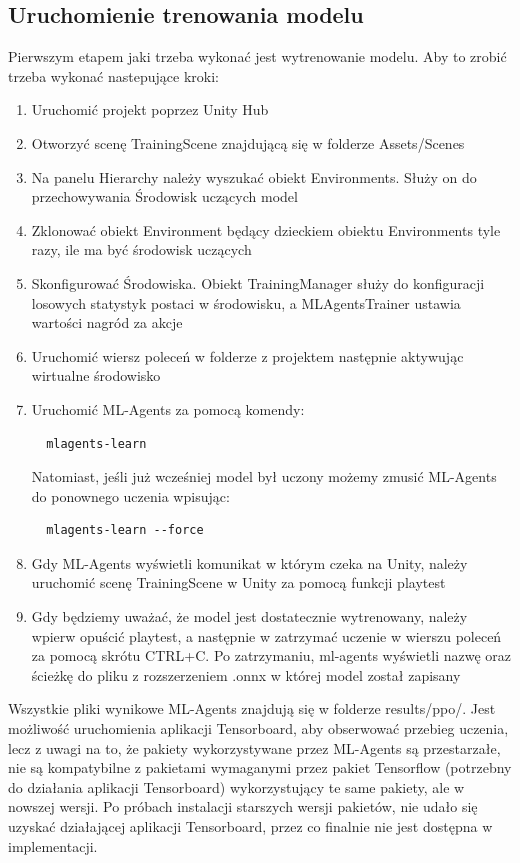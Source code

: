 \documentclass{SGGW-thesis}
\begin{document}
\subsection{Uruchomienie trenowania modelu}
Pierwszym etapem jaki trzeba wykonać jest wytrenowanie modelu. Aby to zrobić trzeba wykonać nastepujące kroki:
\begin{enumerate}
  \item{Uruchomić projekt poprzez Unity Hub}
  \item{Otworzyć scenę TrainingScene znajdującą się w folderze Assets/Scenes}
  \item{Na panelu Hierarchy należy wyszukać obiekt Environments. Służy on do przechowywania Środowisk uczących model}
  \item{Zklonować obiekt Environment będący dzieckiem obiektu Environments tyle razy, ile ma być środowisk uczących}
  \item{Skonfigurować Środowiska. Obiekt TrainingManager służy do konfiguracji losowych statystyk postaci w środowisku, a MLAgentsTrainer ustawia wartości nagród za akcje}
  \item{Uruchomić wiersz poleceń w folderze z projektem następnie aktywując wirtualne środowisko}
  \item{Uruchomić ML-Agents za pomocą komendy:
  \begin{lstlisting}
  mlagents-learn
  \end{lstlisting}
  Natomiast, jeśli już wcześniej model był uczony możemy zmusić ML-Agents do ponownego uczenia wpisując:
  \begin{lstlisting}
  mlagents-learn --force
  \end{lstlisting}}
  \item{Gdy ML-Agents wyświetli komunikat w którym czeka na Unity, należy uruchomić scenę TrainingScene w Unity za pomocą funkcji playtest}
  \item{Gdy będziemy uważać, że model jest dostatecznie wytrenowany, należy wpierw opuścić playtest, a następnie w zatrzymać uczenie w wierszu poleceń za pomocą skrótu CTRL+C.
  Po zatrzymaniu, ml-agents wyświetli nazwę oraz ścieżkę do pliku z rozszerzeniem .onnx w której model został zapisany}
\end{enumerate}
Wszystkie pliki wynikowe ML-Agents znajdują się w folderze results/ppo/. Jest możliwość uruchomienia aplikacji Tensorboard, aby obserwować przebieg uczenia, lecz z uwagi na to, 
że pakiety wykorzystywane przez ML-Agents są przestarzałe, nie są kompatybilne z pakietami wymaganymi przez pakiet Tensorflow (potrzebny do działania aplikacji Tensorboard) wykorzystujący te same pakiety, ale w nowszej wersji.
Po próbach instalacji starszych wersji pakietów, nie udało się uzyskać działającej aplikacji Tensorboard, przez co finalnie nie jest dostępna w implementacji.
\pagebreak
\end{document}
